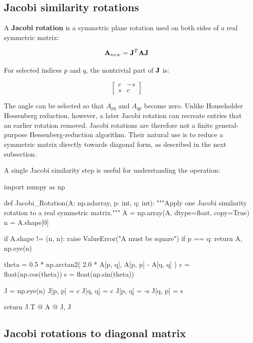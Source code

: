 \subsection{Jacobi similarity rotations}

A \textbf{Jacobi rotation} is a symmetric plane rotation used on both sides of a
real symmetric matrix:

\begin{equation}
    \mathbf{A}_{new}=\mathbf{J}^{T}\mathbf{A}\mathbf{J}
\end{equation}

For selected indices $ p $ and $ q $, the nontrivial part of $ \mathbf{J} $ is:

\begin{equation}
    \begin{bmatrix}
        c & -s \\
        s & c
    \end{bmatrix}
\end{equation}

The angle can be selected so that $ A_{pq} $ and $ A_{qp} $ become zero. Unlike
Householder Hessenberg reduction, however, a later Jacobi rotation can recreate
entries that an earlier rotation removed. Jacobi rotations are therefore not a
finite general-purpose Hessenberg-reduction algorithm. Their natural use is to
reduce a symmetric matrix directly towards diagonal form, as described in the
next subsection.

A single Jacobi similarity step is useful for understanding the operation:

\begin{python}
import numpy as np


def Jacobi_Rotation(A: np.ndarray, p: int, q: int):
    """Apply one Jacobi similarity rotation to a real symmetric matrix."""
    A = np.array(A, dtype=float, copy=True)
    n = A.shape[0]

    if A.shape != (n, n):
        raise ValueError("A must be square")
    if p == q:
        return A, np.eye(n)

    theta = 0.5 * np.arctan2(
        2.0 * A[p, q], A[p, p] - A[q, q]
    )
    c = float(np.cos(theta))
    s = float(np.sin(theta))

    J = np.eye(n)
    J[p, p] = c
    J[q, q] = c
    J[p, q] = -s
    J[q, p] = s

    return J.T @ A @ J, J
\end{python}

\subsection{Jacobi rotations to diagonal matrix}

